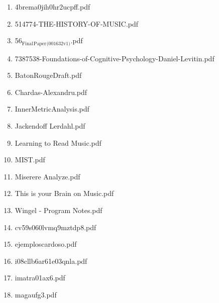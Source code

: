 \documentclass[11pt]{article}
\begin{document}
\begin{enumerate}
\begin{enumerate}
\begin{enumerate}
\item 4brema0jih0hr2ucpff.pdf
\label{sec-1-1-1-1-49-2-2-1-83-7}

\item 514774-THE-HISTORY-OF-MUSIC.pdf
\label{sec-1-1-1-1-49-2-2-1-83-8}

\item 56$_{\text{Final}}$$_{\text{Paper}}$$_{\text{(001632v1)}}$.pdf
\label{sec-1-1-1-1-49-2-2-1-83-9}

\item 7387538-Foundations-of-Cognitive-Psychology-Daniel-Levitin.pdf
\label{sec-1-1-1-1-49-2-2-1-83-10}

\item BatonRougeDraft.pdf
\label{sec-1-1-1-1-49-2-2-1-83-11}

\item Chardas-Alexandru.pdf
\label{sec-1-1-1-1-49-2-2-1-83-12}

\item InnerMetricAnalysis.pdf
\label{sec-1-1-1-1-49-2-2-1-83-13}

\item Jackendoff  Lerdahl.pdf
\label{sec-1-1-1-1-49-2-2-1-83-14}

\item Learning to Read Music.pdf
\label{sec-1-1-1-1-49-2-2-1-83-15}

\item MIST.pdf
\label{sec-1-1-1-1-49-2-2-1-83-16}

\item Miserere Analyze.pdf
\label{sec-1-1-1-1-49-2-2-1-83-17}

\item This is your Brain on Music.pdf
\label{sec-1-1-1-1-49-2-2-1-83-18}

\item Wingel - Program Notes.pdf
\label{sec-1-1-1-1-49-2-2-1-83-19}

\item cv59s060lvmq9mztdp8.pdf
\label{sec-1-1-1-1-49-2-2-1-83-20}

\item ejemploscardoso.pdf
\label{sec-1-1-1-1-49-2-2-1-83-21}

\item i08cllb6ar61e03qnla.pdf
\label{sec-1-1-1-1-49-2-2-1-83-22}

\item imatra01ax6.pdf
\label{sec-1-1-1-1-49-2-2-1-83-23}

\item magaufg3.pdf
\label{sec-1-1-1-1-49-2-2-1-83-24}


\end{enumerate}
\end{enumerate}
\end{enumerate}
\end{document}
